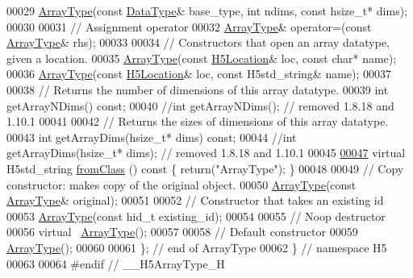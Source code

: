 \begin{DoxyCode}
00029         \hyperlink{class_h5_1_1_array_type}{ArrayType}(\textcolor{keyword}{const} \hyperlink{class_h5_1_1_data_type}{DataType}& base\_type, \textcolor{keywordtype}{int} ndims, \textcolor{keyword}{const} hsize\_t* dims);
00030 
00031         \textcolor{comment}{// Assignment operator}
00032         \hyperlink{class_h5_1_1_array_type}{ArrayType}& operator=(\textcolor{keyword}{const} \hyperlink{class_h5_1_1_array_type}{ArrayType}& rhs);
00033 
00034         \textcolor{comment}{// Constructors that open an array datatype, given a location.}
00035         \hyperlink{class_h5_1_1_array_type}{ArrayType}(\textcolor{keyword}{const} \hyperlink{class_h5_1_1_h5_location}{H5Location}& loc, \textcolor{keyword}{const} \textcolor{keywordtype}{char}* name);
00036         \hyperlink{class_h5_1_1_array_type}{ArrayType}(\textcolor{keyword}{const} \hyperlink{class_h5_1_1_h5_location}{H5Location}& loc, \textcolor{keyword}{const} H5std\_string& name);
00037 
00038         \textcolor{comment}{// Returns the number of dimensions of this array datatype.}
00039         \textcolor{keywordtype}{int} getArrayNDims() \textcolor{keyword}{const};
00040         \textcolor{comment}{//int getArrayNDims(); // removed 1.8.18 and 1.10.1}
00041 
00042         \textcolor{comment}{// Returns the sizes of dimensions of this array datatype.}
00043         \textcolor{keywordtype}{int} getArrayDims(hsize\_t* dims) \textcolor{keyword}{const};
00044         \textcolor{comment}{//int getArrayDims(hsize\_t* dims); // removed 1.8.18 and 1.10.1}
00045 
\hyperlink{class_h5_1_1_array_type_af1fff9817f1c205a2192241fd79e51c1}{00047}         \textcolor{keyword}{virtual} H5std\_string \hyperlink{class_h5_1_1_array_type_af1fff9817f1c205a2192241fd79e51c1}{fromClass} ()\textcolor{keyword}{ const }\{ \textcolor{keywordflow}{return}(\textcolor{stringliteral}{"ArrayType"}); \}
00048 
00049         \textcolor{comment}{// Copy constructor: makes copy of the original object.}
00050         \hyperlink{class_h5_1_1_array_type}{ArrayType}(\textcolor{keyword}{const} \hyperlink{class_h5_1_1_array_type}{ArrayType}& original);
00051 
00052         \textcolor{comment}{// Constructor that takes an existing id}
00053         \hyperlink{class_h5_1_1_array_type}{ArrayType}(\textcolor{keyword}{const} hid\_t existing\_id);
00054 
00055         \textcolor{comment}{// Noop destructor}
00056         \textcolor{keyword}{virtual} ~\hyperlink{class_h5_1_1_array_type}{ArrayType}();
00057 
00058         \textcolor{comment}{// Default constructor}
00059         \hyperlink{class_h5_1_1_array_type}{ArrayType}();
00060 
00061 \}; \textcolor{comment}{// end of ArrayType}
00062 \} \textcolor{comment}{// namespace H5}
00063 
00064 \textcolor{preprocessor}{#endif // \_\_H5ArrayType\_H}
\end{DoxyCode}
